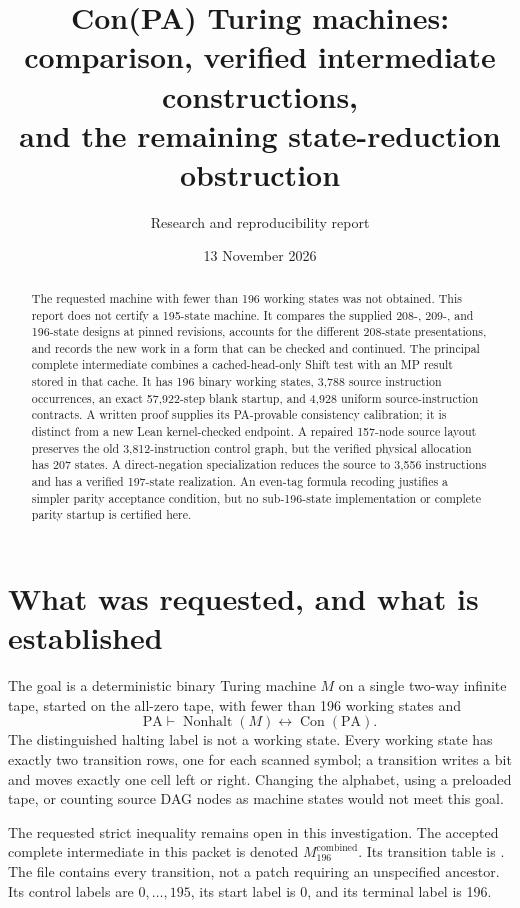\documentclass[11pt,a4paper]{article}
\title{\textbf{Con(PA) Turing machines:\\comparison, verified intermediate constructions,\\and the remaining state-reduction obstruction}}
\author{Research and reproducibility report}
\date{13 November 2026}
\newcommand{\PA}{\mathrm{PA}}
\newcommand{\Con}{\operatorname{Con}}
\newcommand{\Nonhalt}{\operatorname{Nonhalt}}
\begin{document}
\maketitle
\begin{abstract}
The requested machine with fewer than 196 working states was not obtained.
This report does not certify a 195-state machine. It compares the supplied
208-, 209-, and 196-state designs at pinned revisions, accounts for the
different 208-state presentations, and records the new work in a form that
can be checked and continued. The principal complete intermediate combines
a cached-head-only Shift test with an MP result stored in that cache. It
has 196 binary working states, 3,788 source instruction occurrences, an exact
57,922-step blank startup, and 4,928 uniform source-instruction contracts.
A written proof supplies its PA-provable consistency calibration; it is
distinct from a new Lean kernel-checked endpoint. A repaired 157-node
source layout preserves the old 3,812-instruction control graph, but the
verified physical allocation has 207 states. A direct-negation specialization
reduces the source to 3,556 instructions and has a verified 197-state
realization. An even-tag formula recoding
justifies a simpler parity acceptance condition, but no sub-196-state
implementation or complete parity startup is certified here.
\end{abstract}
\tableofcontents
\newpage

\section{What was requested, and what is established}
The goal is a deterministic binary Turing machine $M$ on a single two-way
infinite tape, started on the all-zero tape, with fewer than 196 working
states and
\[
          \PA\vdash\Nonhalt(M)\longleftrightarrow\Con(\PA).
\]
The distinguished halting label is not a working state. Every working state
has exactly two transition rows, one for each scanned symbol; a transition
writes a bit and moves exactly one cell left or right. Changing the alphabet,
using a preloaded tape, or counting source DAG nodes as machine states
would not meet this goal.

The requested strict inequality remains open in this investigation. The
accepted complete intermediate in this packet is denoted
$M_{196}^{\mathrm{combined}}$. Its transition table is
. The file contains every transition, not a
patch requiring an unspecified ancestor. Its control labels are
$0,\ldots,195$, its start label is 0, and its terminal label is 196.
\end{document}
